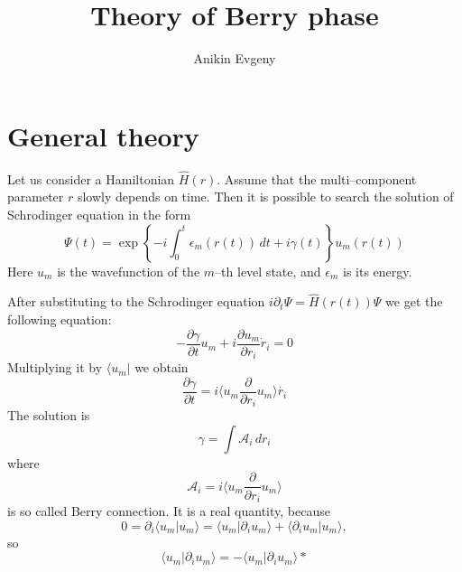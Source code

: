 \documentclass{article}
\title{Theory of Berry phase}
\author{Anikin Evgeny}
\begin{document}
\maketitle
\section{General theory}
Let us consider a Hamiltonian $\hat{H}(r)$. Assume that the multi--component parameter $r$
slowly depends on time. Then it is possible to search the solution of Schrodinger equation
in the form
\begin{equation}
    \Psi(t) = \exp\left\{-i\int_0^t \epsilon_m(r(t)) \,dt + i\gamma(t)\right\} u_m(r(t))
\end{equation}
Here $u_m$ is the wavefunction of the $m$--th level state, and $\epsilon_m$ is its energy.

After substituting to the Schrodinger equation $i\partial_t\Psi = \hat{H}(r(t)) \Psi$ we
get the following equation:
\begin{equation}
    -\frac{\partial \gamma}{\partial t} u_m + 
    i\frac{\partial u_m}{\partial r_i}\dot{r}_i = 0
\end{equation}
Multiplying it by $\langle u_m |$ we obtain
\begin{equation}
    \frac{\partial \gamma}{\partial t} = i\langle u_m \frac{\partial}{\partial r_i}
                    u_m\rangle
                    \dot{r_i}
\end{equation}
The solution is
\begin{equation}
    \gamma = \int \mathcal{A}_i \,dr_i
\end{equation}
where
\begin{equation}
    \label{connection}
    \mathcal{A}_i = i\langle u_m \frac{\partial}{\partial r_i} u_m\rangle
\end{equation}
is so called Berry connection.
It is a real quantity, because
\begin{equation}
    0 = \partial_i \langle u_m | u_m \rangle = \langle u_m | \partial_i u_m \rangle + 
                                               \langle \partial_i u_m |  u_m \rangle,
\end{equation}
so
\begin{equation}
    \langle u_m | \partial_i u_m \rangle = -\langle u_m | \partial_i u_m \rangle* 
\end{equation}
\end{document}
